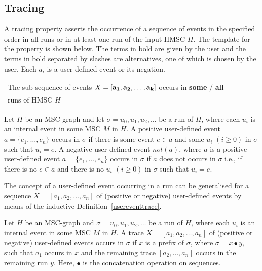 \documentclass{entcs}
\begin{document}
\subsection{Tracing}\label{tracing}

A tracing property asserts the occurrence of a sequence 
of events in the specified order in all runs or in at 
least one run of the input HMSC $H$. The template for 
the property is shown below. The terms in bold are given 
by the user and the terms in bold separated by slashes 
are alternatives, one of which is chosen by the user. 
Each $a_i$ is a user-defined event or its negation.

\begin{tabular}{|l|}
\hline
The sub-sequence of events {\bf $X = {\bf [a_1,a_2,\ldots,a_k]}$} 
occurs in {\bf some} / {\bf all} \\
runs of HMSC {\bf $H$} \\
\hline
\end{tabular}

\begin{definition}
\label{userevent}
Let $H$ be an MSC-graph and let 
$\sigma = u_0,u_1,u_2,\ldots$ be a run of $H$, where each $u_i$ 
is an internal event in some MSC $M$ in $H$. A positive 
user-defined event $a = \{e_1,\ldots,e_n\}$ occurs in 
$\sigma$ if there is some event $e \in a$ and some 
$u_i$ $(i \geq 0)$ in $\sigma$ such that $u_i = e$. 
A negative user-defined event $not(a)$, where $a$ is a 
positive user-defined event $a = \{e_1,\ldots,e_n\}$ 
occurs in $\sigma$ if $a$ does not occurs in $\sigma$ 
i.e., if there is no $e \in a$ and there is no 
$u_i$ $(i \geq 0)$ in $\sigma$ such that $u_i = e$. 
\end{definition}

The concept of a user-defined event occurring in a run 
can be generalised for a sequence $X = [a_1,a_2,\ldots,a_n]$ 
of (positive or negative) user-defined events by means 
of the inductive Definition~\ref{usereventtrace}.  

\begin{definition}
\label{usereventtrace}
Let $H$ be an MSC-graph and $\sigma = u_0,u_1,u_2,\ldots$ 
be a run of $H$, where each $u_i$ is an internal event 
in some MSC $M$ in $H$. A trace $X = [a_1,a_2,\ldots,a_n]$ 
of (positive or negative) user-defined events occurs 
in $\sigma$ if $x$ is a prefix of $\sigma$, where 
$\sigma = x \bullet y$,  such that $a_1$ occurs in $x$ 
and the remaining trace $[a_2,\ldots,a_n]$ occurs in the 
remaining run $y$. Here, $\bullet$ is the concatenation 
operation on sequences.
\end{definition}
\end{document}
